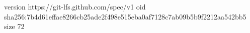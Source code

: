 version https://git-lfs.github.com/spec/v1
oid sha256:7b4d61effae8266cb25ade2f498e515eba0af7128c7ab09b5b9f2212aa542bb5
size 72
